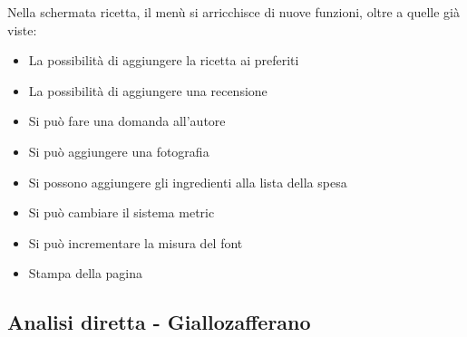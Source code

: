 \documentclass[12pt,a4paper,openright,twoside]{article}
\begin{document}
Nella schermata ricetta, il menù si arricchisce di nuove funzioni, oltre a quelle già viste:
\begin{itemize}
\item La possibilità di aggiungere la ricetta ai preferiti
\item La possibilità di aggiungere una recensione
\item Si può fare una domanda all'autore
\item Si può aggiungere una fotografia
\item Si possono aggiungere gli ingredienti alla lista della spesa
\item Si può cambiare il sistema metric
\item Si può incrementare la misura del font
\item Stampa della pagina
\end{itemize}


\subsection*{Analisi diretta - Giallozafferano}
\end{document}
